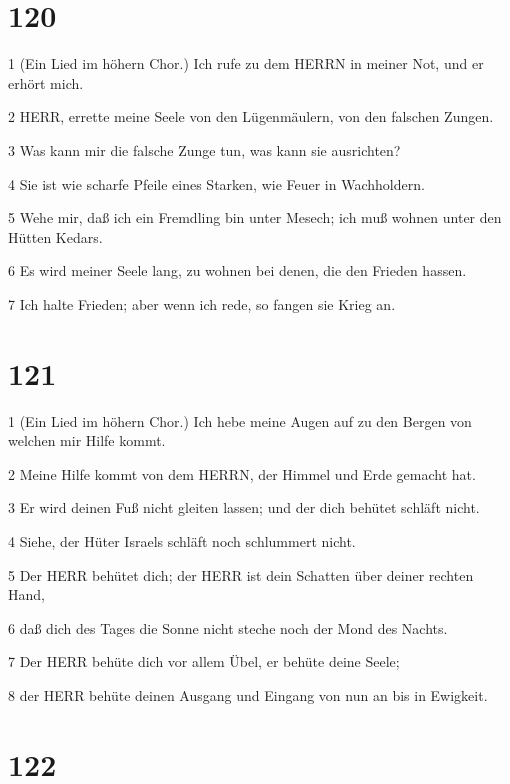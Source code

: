 \chapter{120}

\par 1 (Ein Lied im höhern Chor.) Ich rufe zu dem HERRN in meiner Not, und er erhört mich.
\par 2 HERR, errette meine Seele von den Lügenmäulern, von den falschen Zungen.
\par 3 Was kann mir die falsche Zunge tun, was kann sie ausrichten?
\par 4 Sie ist wie scharfe Pfeile eines Starken, wie Feuer in Wachholdern.
\par 5 Wehe mir, daß ich ein Fremdling bin unter Mesech; ich muß wohnen unter den Hütten Kedars.
\par 6 Es wird meiner Seele lang, zu wohnen bei denen, die den Frieden hassen.
\par 7 Ich halte Frieden; aber wenn ich rede, so fangen sie Krieg an.

\chapter{121}

\par 1 (Ein Lied im höhern Chor.) Ich hebe meine Augen auf zu den Bergen von welchen mir Hilfe kommt.
\par 2 Meine Hilfe kommt von dem HERRN, der Himmel und Erde gemacht hat.
\par 3 Er wird deinen Fuß nicht gleiten lassen; und der dich behütet schläft nicht.
\par 4 Siehe, der Hüter Israels schläft noch schlummert nicht.
\par 5 Der HERR behütet dich; der HERR ist dein Schatten über deiner rechten Hand,
\par 6 daß dich des Tages die Sonne nicht steche noch der Mond des Nachts.
\par 7 Der HERR behüte dich vor allem Übel, er behüte deine Seele;
\par 8 der HERR behüte deinen Ausgang und Eingang von nun an bis in Ewigkeit.

\chapter{122}

